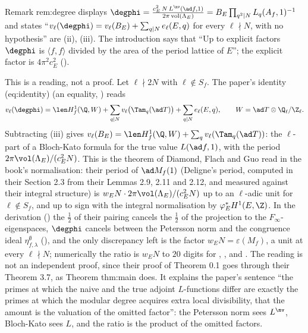 \begin{paperlink}
Remark rem:degree displays $\degphi=\frac{c_E^2\,N\,L^{\nv}(\ad f,1)}{2\pi\operatorname{vol}(\Lambda_E)}=B_E\prod_{q^2\mid N}L_q(A_f,1)^{-1}$ and states ``$v_\ell(\degphi)=v_\ell(B_E)+\sum_{q\mid N}e_\ell(E,q)$
for every $\ell\nmid N$, with no hypothesis'' are (ii), (iii). The introduction says that ``Up to explicit factors $\degphi$ is
$\langle f,f\rangle$ divided by the area of the period lattice of $E$''; the explicit factor is $4\pi^2c_E^2$ ().
\end{paperlink}

\begin{remark}\label{rem:lfunctions:bloch-kato-reading}
This is a reading, not a proof. Let $\ell\nmid2N$ with $\ell\notin S_f$. The paper's identity (eq:identity) (an equality, ) reads
\[
v_\ell(\degphi)=\len H^1_f(\Q,W)+\sum_{q\mid N}v_\ell\bigl(\Tam_q(\ad T)\bigr)+\sum_{q\mid N}e_\ell(E,q),\qquad W=\ad T\otimes\Q_\ell/\Z_\ell.
\]
Subtracting (iii) gives $v_\ell(B_E)=\len H^1_f(\Q,W)+\sum_qv_\ell(\Tam_q(\ad T))$: the $\ell$-part of a Bloch-Kato formula for the true value $L(\ad f,1)$,
with the period $2\pi\vol(\Lambda_E)/(c_E^2N)$. This is the theorem of Diamond, Flach and Guo \cite[Theorem 0.1]{DFG04} read in the book's normalisation: their period of
$\ad M_f(1)$ (Deligne's period, computed in their Section 2.3 from their Lemmas 2.9, 2.11 and 2.12, and measured against their integral structure) is $w_EN\cdot2\pi\vol(\Lambda_E)/(c_E^2N)$
up to an $\ell$-adic unit for $\ell\notin S_f$, and up to sign with the integral normalisation by $\varphi_E^*H^1(E,\Z)$. In the derivation () the $\frac12$ of their pairing
cancels the $\frac12$ of the projection to the $F_\infty$-eigenspaces, $\degphi$ cancels between the Petersson norm and the congruence ideal $\eta^\emptyset_{f,\lambda}$ (), and the
only discrepancy left is the factor $w_EN=\varepsilon(M_f)$, a unit at every $\ell\nmid N$; numerically the ratio is $w_EN$ to $20$ digits for , ,  and .
The reading is not an independent proof, since their proof of Theorem 0.1 goes through their Theorem 3.7, as Theorem thm:main does. It explains the paper's sentence ``the primes at which the
naive and the true adjoint $L$-functions differ are exactly the primes at which the modular degree acquires extra local divisibility, that the amount is the
valuation of the omitted factor'': the Petersson norm sees $L^{\nv}$, Bloch-Kato sees $L$, and the ratio is the product of the omitted factors.
\end{remark}

